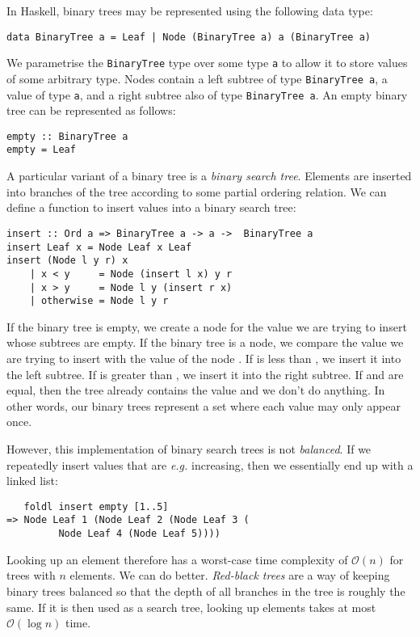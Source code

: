In Haskell, binary trees may be represented using the following data type:
\begin{verbatim}
data BinaryTree a = Leaf | Node (BinaryTree a) a (BinaryTree a)
\end{verbatim}
We parametrise the \texttt{\small BinaryTree} type over some type \texttt{\small a} to allow it to store values of some arbitrary type. Nodes contain a left subtree of type \texttt{\small BinaryTree a}, a value of type \texttt{\small a}, and a right subtree also of type \texttt{\small BinaryTree a}. An empty binary tree can be represented as follows:
\begin{verbatim}
empty :: BinaryTree a
empty = Leaf
\end{verbatim}
A particular variant of a binary tree is a \emph{binary search tree}. Elements are inserted into branches of the tree according to some partial ordering relation. We can define a function to insert values into a binary search tree:
\begin{verbatim}
insert :: Ord a => BinaryTree a -> a ->  BinaryTree a
insert Leaf x = Node Leaf x Leaf
insert (Node l y r) x
    | x < y     = Node (insert l x) y r 
    | x > y     = Node l y (insert r x) 
    | otherwise = Node l y r
\end{verbatim}
If the binary tree is empty, we create a node for the value  we are trying to insert whose subtrees are empty. If the binary tree is a node, we compare the value  we are trying to insert with the value of the node . If  is less than , we insert it into the left subtree. If  is greater than , we insert it into the right subtree. If  and  are equal, then the tree already contains the value and we don't do anything. In other words, our binary trees represent a set where each value may only appear once.

However, this implementation of binary search trees is not \emph{balanced}. If we repeatedly insert values that are \emph{e.g.} increasing, then we essentially end up with a linked list:
\begin{verbatim}
   foldl insert empty [1..5]
=> Node Leaf 1 (Node Leaf 2 (Node Leaf 3 (
         Node Leaf 4 (Node Leaf 5))))
\end{verbatim}
Looking up an element therefore has a worst-case time complexity of $\mathcal{O}(n)$ for trees with $n$ elements. We can do better. \emph{Red-black trees} are a way of keeping binary trees balanced so that the depth of all branches in the tree is roughly the same. If it is then used as a search tree, looking up elements takes at most $\mathcal{O}(\log n)$ time.

